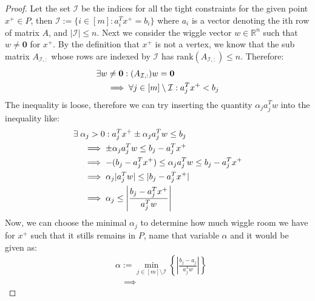 \documentclass[]{article}
\theoremstyle{definition}
\begin{document}
    \begin{proof}
        Let the set $\mathcal I$ be the indices for all the tight constraints for the given point $x^+ \in P$, then $\mathcal I := \{i\in [m]: a_i^Tx^+= b_i\}$ where $a_i$ is a vector denoting the ith row of matrix $A$, and $|\mathcal I| \le n$. Next we consider the wiggle vector $w \in \mathbb R^n$ such that $w \neq \mathbf 0$ for $x^+$. By the definition that $x^+$ is not a vertex, we know that the sub matrix $A_{\mathcal I, :}$ whose rows are indexed by $\mathcal I$ has $\text{rank}(A_{\mathcal I, :})\le n$. Therefore: 
        \begin{align}
            & \exists w \neq \mathbf 0 : (A_{\mathcal I, :})w = \mathbf 0
            \\
            &\hspace{1.1em} \implies
            \forall j \in [m]\setminus \mathcal I: 
            a_j^Tx^+ < b_j
        \end{align}
        The inequality is loose, therefore we can try inserting the quantity $\alpha_ja_j^Tw$ into the inequality like: 
        \begin{align}
            & \exists\; \alpha_j > 0 : a_j^Tx^+ \pm \alpha_ja_j^Tw \le b_j
            \\
            &\hspace{1.1em} \implies 
                \pm \alpha_j a^T_jw \le b_j - a_j^Tx^+
            \\
            &\hspace{1.1em} \implies 
                -(b_j - a_j^Tx^+)\le \alpha_j a^T_jw \le b_j - a_j^Tx^+ 
            \\
            &\hspace{1.1em} \implies 
            \alpha_j
            |a_j^Tw|\le |b_j - a_j^Tx^+|
            \\
            &\hspace{1.1em} \implies 
            \alpha_j \le \left|
                \frac{b_j - a_j^Tx^+}{a_j^Tw}
            \right|
        \end{align}
        Now, we can choose the minimal $\alpha_j$ to determine how much wiggle room we have for $x^+$ such that it stills remains in $P$, name that variable $\alpha$ and it would be given as: 
        \begin{align}
            & \alpha := \min_{j \in [m]\setminus \mathcal I}\left\lbrace
                \left|\frac{b_j - a_j}{a^T_jw}\right|
            \right\rbrace
            \\&\quad\implies

\end{align}
\end{proof}
\end{document}

